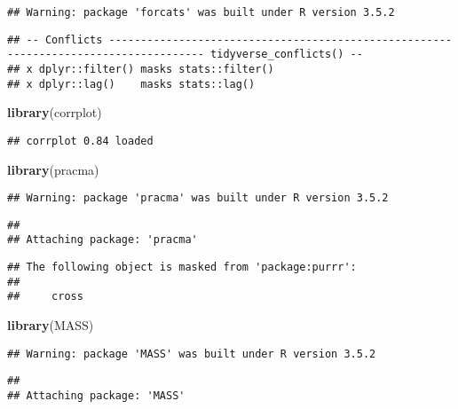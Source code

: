 \documentclass[]{article}
\newenvironment{Shaded}{\begin{snugshade}}{\end{snugshade}}
\newcommand{\KeywordTok}[1]{\textcolor[rgb]{0.13,0.29,0.53}{\textbf{#1}}}
\newcommand{\NormalTok}[1]{#1}
\begin{document}
\begin{verbatim}
## Warning: package 'forcats' was built under R version 3.5.2
\end{verbatim}

\begin{verbatim}
## -- Conflicts ------------------------------------------------------------------------------------- tidyverse_conflicts() --
## x dplyr::filter() masks stats::filter()
## x dplyr::lag()    masks stats::lag()
\end{verbatim}

\begin{Shaded}
\begin{Highlighting}[]
\KeywordTok{library}\NormalTok{(corrplot)}
\end{Highlighting}
\end{Shaded}

\begin{verbatim}
## corrplot 0.84 loaded
\end{verbatim}

\begin{Shaded}
\begin{Highlighting}[]
\KeywordTok{library}\NormalTok{(pracma)}
\end{Highlighting}
\end{Shaded}

\begin{verbatim}
## Warning: package 'pracma' was built under R version 3.5.2
\end{verbatim}

\begin{verbatim}
## 
## Attaching package: 'pracma'
\end{verbatim}

\begin{verbatim}
## The following object is masked from 'package:purrr':
## 
##     cross
\end{verbatim}

\begin{Shaded}
\begin{Highlighting}[]
\KeywordTok{library}\NormalTok{(MASS)}
\end{Highlighting}
\end{Shaded}

\begin{verbatim}
## Warning: package 'MASS' was built under R version 3.5.2
\end{verbatim}

\begin{verbatim}
## 
## Attaching package: 'MASS'
\end{verbatim}
\end{document}
